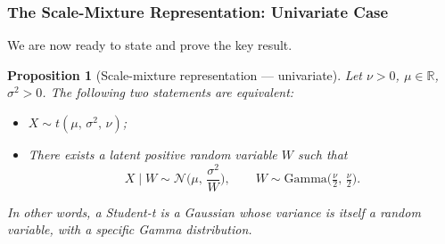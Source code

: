 \documentclass[11pt, a4paper, oneside]{article}
\newtheorem{proposition}{Proposition}
\begin{document}
\subsubsection{The Scale-Mixture Representation: Univariate Case}

We are now ready to state and prove the key result.

\begin{proposition}[Scale-mixture representation — univariate]
\label{prop:scalemix-univariate}
Let $\nu > 0$, $\mu \in \mathbb{R}$, $\sigma^2 > 0$. The following two
statements are equivalent:
\begin{itemize}[leftmargin=1.5em]
    \item[(i)] $X \sim t(\mu,\, \sigma^2,\, \nu)$;
    \item[(ii)] There exists a latent positive random variable $W$ such
                that
                \[
                X \mid W \sim \mathcal{N}\!\Big(\mu,\, \frac{\sigma^2}{W}\Big),
                \qquad
                W \sim \text{Gamma}\!\big(\tfrac{\nu}{2},\, \tfrac{\nu}{2}\big).
                \]
\end{itemize}
In other words, a Student-t is a Gaussian whose variance is itself a random
variable, with a specific Gamma distribution.
\end{proposition}
\end{document}
